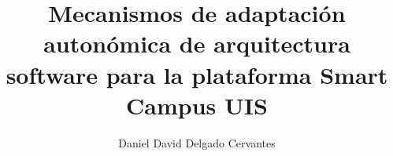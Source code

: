 
\title{Mecanismos de adaptación autonómica de arquitectura software para la plataforma Smart Campus UIS}
\author{Daniel David Delgado Cervantes}
\maketitle